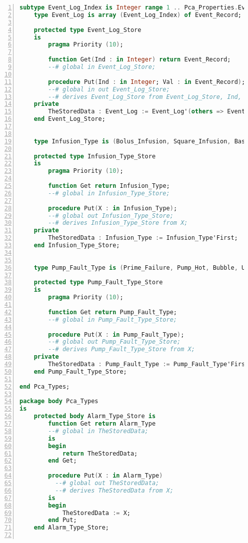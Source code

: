 \begin{lstlisting}[language=ada, gobble=0, numbers=left, caption={\lstinline{Pca_Types} package}]
    subtype Event_Log_Index is Integer range 1 .. Pca_Properties.Event_Log_Size;
    type Event_Log is array (Event_Log_Index) of Event_Record;

    protected type Event_Log_Store
    is
        pragma Priority (10);

        function Get(Ind : in Integer) return Event_Record;
        --# global in Event_Log_Store;

        procedure Put(Ind : in Integer; Val : in Event_Record);
        --# global in out Event_Log_Store;
        --# derives Event_Log_Store from Event_Log_Store, Ind, Val;
    private
        TheStoredData : Event_Log := Event_Log'(others => Event_Record'(Time => Bless_Types.Time'First));
    end Event_Log_Store;


    type Infusion_Type is (Bolus_Infusion, Square_Infusion, Basal_Infusion, KVO_Infusion);

    protected type Infusion_Type_Store
    is
        pragma Priority (10);

        function Get return Infusion_Type;
        --# global in Infusion_Type_Store;

        procedure Put(X : in Infusion_Type);
        --# global out Infusion_Type_Store;
        --# derives Infusion_Type_Store from X;
    private
        TheStoredData : Infusion_Type := Infusion_Type'First;
    end Infusion_Type_Store;


    type Pump_Fault_Type is (Prime_Failure, Pump_Hot, Bubble, Upstream_Occlusion_Fault, Downstream_Occlusion_Fault, Overinfusion, Underinfusion);

    protected type Pump_Fault_Type_Store
    is
        pragma Priority (10);

        function Get return Pump_Fault_Type;
        --# global in Pump_Fault_Type_Store;

        procedure Put(X : in Pump_Fault_Type);
        --# global out Pump_Fault_Type_Store;
        --# derives Pump_Fault_Type_Store from X;
    private
        TheStoredData : Pump_Fault_Type := Pump_Fault_Type'First;
    end Pump_Fault_Type_Store;

end Pca_Types;

package body Pca_Types
is
    protected body Alarm_Type_Store is
        function Get return Alarm_Type
        --# global in TheStoredData;
        is
        begin
            return TheStoredData;
        end Get;

        procedure Put(X : in Alarm_Type)
          --# global out TheStoredData;
          --# derives TheStoredData from X;
        is
        begin
            TheStoredData := X;
        end Put;
    end Alarm_Type_Store;


\end{lstlisting}

